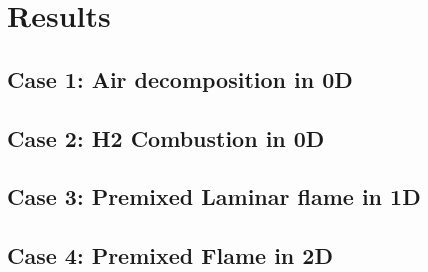 \newpage
\chapter{Results}

\section{Case 1: Air decomposition in 0D}

\section{Case 2: H2 Combustion in 0D}

\section{Case 3: Premixed Laminar flame in 1D}

\section{Case 4: Premixed Flame in 2D}
